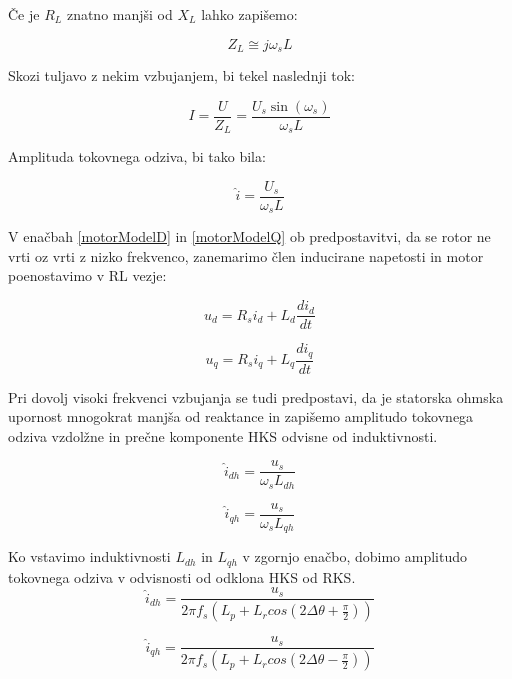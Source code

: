 \documentclass[a4paper,twoside,openright,12pt,slovene]{book}
\begin{document}
Če je $R_L$ znatno manjši od $X_L$ lahko zapišemo:

\begin{equation}
    Z_L \cong j\omega_sL
\end{equation}

Skozi tuljavo z nekim vzbujanjem, bi tekel naslednji tok:

\begin{equation}
    I = \frac{U}{Z_L} = \frac{U_s \sin{(\omega_s)}}{\omega_sL}
\end{equation}

Amplituda tokovnega odziva, bi tako bila:

\begin{equation}
    \hat{i} = \frac{U_s}{\omega_sL}
\end{equation}

V enačbah \ref{motorModelD} in \ref{motorModelQ} ob predpostavitvi, da se rotor ne vrti oz vrti z nizko frekvenco, zanemarimo člen inducirane napetosti in motor poenostavimo v RL vezje:

\begin{equation} \label{motorModelD}
    u_d = R_si_d+L_d\frac{di_d}{dt}
\end{equation}

\begin{equation} \label{motorModelQ}
    u_q = R_si_q+L_q\frac{di_q}{dt}
\end{equation}

Pri dovolj visoki frekvenci vzbujanja se tudi predpostavi, da je statorska ohmska upornost mnogokrat manjša od reaktance in zapišemo amplitudo tokovnega odziva vzdolžne in prečne komponente HKS
odvisne od induktivnosti.

\begin{equation}
    \hat{i}_{dh} = \frac{u_s}{\omega_sL_{dh}}
\end{equation}

\begin{equation}
    \hat{i}_{qh} = \frac{u_s}{\omega_sL_{qh}}
\end{equation}

Ko vstavimo induktivnosti $L_{dh}$ in $L_{qh}$ v zgornjo enačbo, dobimo amplitudo tokovnega odziva v odvisnosti od odklona HKS od RKS.
\begin{equation}
    \hat{i}_{dh} = \frac{u_s}{2\pi f_s (L_p + L_r cos(2\Delta\theta + \frac{\pi}{2}))}
\end{equation}

\begin{equation}
    \hat{i}_{qh} = \frac{u_s}{2\pi f_s (L_p + L_r cos(2\Delta\theta - \frac{\pi}{2}))}
\end{equation}
\end{document}
